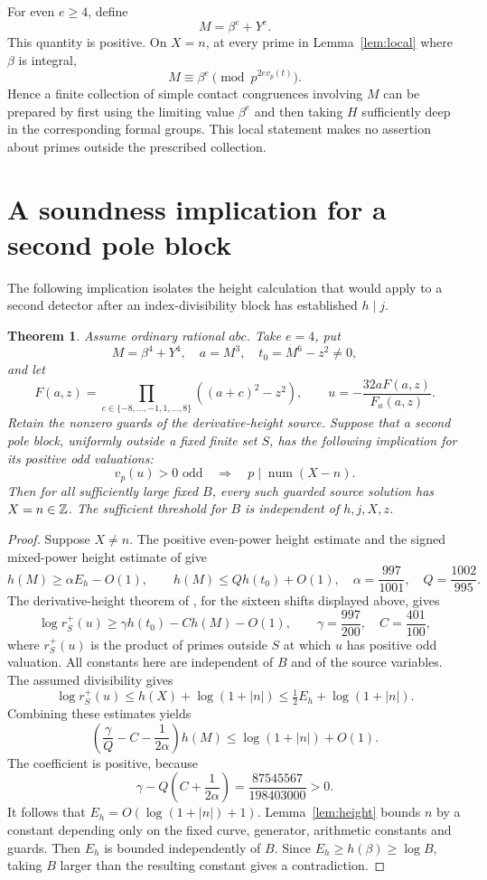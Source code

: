 \documentclass[11pt,a4paper]{article}
\newtheorem{theorem}{Theorem}[section]
\begin{document}
For even $e\ge4$, define
\[
 M=\beta^e+Y^e.
\]
This quantity is positive. On $X=n$, at every prime in
Lemma~\ref{lem:local} where $\beta$ is integral,
\[
 M\equiv\beta^e\pmod{p^{2e v_p(t)}}.
\]
Hence a finite collection of simple contact congruences involving
$M$ can be prepared by first using the limiting value $\beta^e$
and then taking $H$ sufficiently deep in the corresponding formal
groups. This local statement makes no assertion about primes
outside the prescribed collection.

\section{A soundness implication for a second pole block}

The following implication isolates the height calculation that
would apply to a second detector after an index-divisibility
block has established $h\mid j$.

\begin{theorem}\label{thm:soundness}
Assume ordinary rational $abc$. Take $e=4$, put
\[
 M=\beta^4+Y^4,\quad a=M^3,\quad t_0=M^6-z^2\ne0,
\]
and let
\[
 F(a,z)=\prod_{c\in\{-8,\ldots,-1,1,\ldots,8\}}
                  ((a+c)^2-z^2),\qquad
 u=-\frac{32aF(a,z)}{F_a(a,z)}.
\]
Retain the nonzero guards of the derivative-height source.
Suppose that a second pole block, uniformly outside a fixed finite
set $S$, has the following implication for its positive odd
valuations:
\[
 v_p(u)>0\text{ odd}\quad\Longrightarrow\quad
             p\mid\operatorname{num}(X-n).
\]
Then for all sufficiently large fixed $B$, every such guarded
source solution has $X=n\in\mathbb Z$. The sufficient threshold for
$B$ is independent of $h,j,X,z$.
\end{theorem}
\begin{proof}
Suppose $X\ne n$. The positive even-power height estimate and
the signed mixed-power height estimate of \cite{Height} give
\[
 h(M)\ge\alpha E_h-O(1),\qquad
 h(M)\le Qh(t_0)+O(1),
 \quad\alpha=\frac{997}{1001},\quad Q=\frac{1002}{995}.
\]
The derivative-height theorem of \cite{Derivative}, for the
sixteen shifts displayed above, gives
\[
 \log r_S^+(u)\ge\gamma h(t_0)-C h(M)-O(1),\qquad
 \gamma=\frac{997}{200},\quad C=\frac{401}{100},
\]
where $r_S^+(u)$ is the product of primes outside $S$ at which
$u$ has positive odd valuation. All constants here are independent
of $B$ and of the source variables. The assumed divisibility gives
\[
 \log r_S^+(u)\le h(X)+\log(1+|n|)
                  \le\tfrac12E_h+\log(1+|n|).
\]
Combining these estimates yields
\[
 \left(\frac\gamma Q-C-\frac1{2\alpha}\right)h(M)
                     \le\log(1+|n|)+O(1).
\]
The coefficient is positive, because
\[
 \gamma-Q\left(C+\frac1{2\alpha}\right)
                       =\frac{87545567}{198403000}>0.
\]
It follows that $E_h=O(\log(1+|n|)+1)$.
Lemma~\ref{lem:height} bounds $n$ by a constant depending only
on the fixed curve, generator, arithmetic constants and guards.
Then $E_h$ is bounded independently of $B$. Since
$E_h\ge h(\beta)\ge\log B$, taking $B$ larger than the resulting
constant gives a contradiction.
\end{proof}
\end{document}
